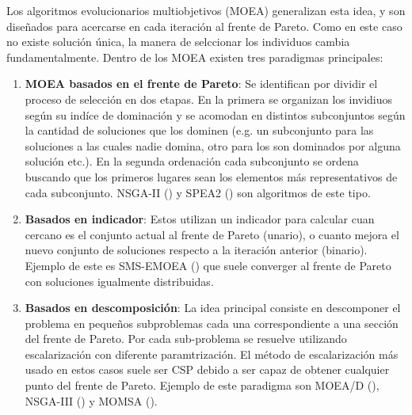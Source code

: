 Los algoritmos evolucionarios multiobjetivos (MOEA) generalizan esta idea, y son diseñados para acercarse en cada iteraci\'on  al frente de Pareto. Como en este caso no existe soluci\'on \'unica, la manera de selccionar los individuos cambia fundamentalmente. Dentro de los MOEA existen tres paradigmas principales:

\begin{enumerate}
    \item \textbf{MOEA basados en el frente de Pareto}\label{background:def:MOEA}: Se identifican por dividir el proceso de selecci\'on en dos etapas. En la primera se organizan los invidiuos seg\'un su ind\'ice de dominaci\'on y se acomodan en distintos subconjuntos seg\'un la cantidad de soluciones que los dominen (e.g. un subconjunto para las soluciones a las cuales nadie domina, otro para los son dominados por alguna soluci\'on etc.). En la segunda ordenaci\'on cada subconjunto se ordena buscando que los primeros lugares sean los elementos m\'as representativos de cada subconjunto. NSGA-II (\cite{deb2002fast}) y SPEA2 (\cite{zitzler1999multiobjective}) son algoritmos de este tipo.

    \item \textbf{Basados en indicador}: Estos utilizan un indicador para calcular cuan cercano es el conjunto actual al frente de Pareto (unario), o cuanto mejora el nuevo conjunto de soluciones respecto a la iteraci\'on anterior (binario). Ejemplo de este es SMS-EMOEA (\cite{emmerich2005emo}) que suele converger al frente de Pareto con soluciones igualmente distribuidas.

    \item \textbf{Basados en descomposici\'on}: La idea principal consiste en descomponer el problema en pequeños subproblemas cada una correspondiente a una secci\'on del frente de Pareto. Por cada sub-problema se resuelve utilizando escalarizaci\'on con diferente paramtrizaci\'on. El m\'etodo de escalarizaci\'on m\'as usado en estos casos suele ser CSP debido a ser capaz de obtener cualquier punto del frente de Pareto. Ejemplo de este paradigma son MOEA/D (\cite{zhang2007moea}), NSGA-III (\cite{deb2013evolutionary}) y MOMSA (\cite{sharifi2021new}).

\end{enumerate}

